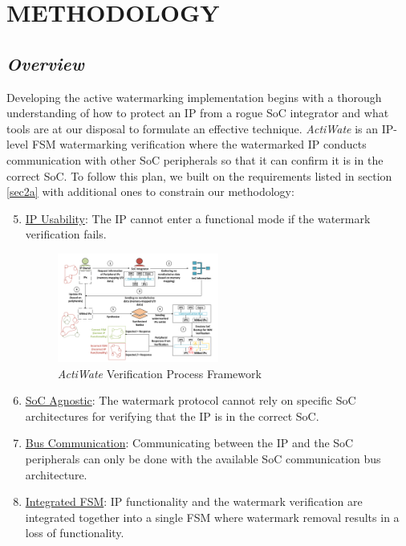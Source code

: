 \documentclass[onecolumn]{IEEEtran}
\begin{document}
\section{METHODOLOGY}
\label{sec3}
\subsection{\textit{Overview}}
\label{sec3a}
Developing the active watermarking implementation begins with a
thorough understanding of how to protect an IP from a rogue SoC
integrator and what tools are at our disposal to formulate an effective
technique. \textit{ActiWate} is an IP-level FSM watermarking verification
where the watermarked IP conducts communication with other SoC
peripherals so that it can confirm it is in the correct SoC. To follow
this plan, we built on the requirements listed in section \ref{sec2a} with
additional ones to constrain our methodology:

\begin{enumerate}[label=(R\arabic*)]
	\setcounter{enumi}{4}
	\item \underline{IP Usability}: The IP cannot enter a functional mode if the
	watermark verification fails.
	\begin{figure}[H]
		\centering
		\includegraphics[width=0.5\textwidth]{fig2.png}
		\caption{\textit{ActiWate} Verification Process Framework}
		\captionsetup{justification=centering}
		\label{fig2}
	\end{figure}
	
	\item \underline{SoC Agnostic}: The watermark protocol cannot rely on specific
	SoC architectures for verifying that the IP is in the correct SoC.
	
	\item \underline{Bus Communication}: Communicating between the IP and the
	SoC peripherals can only be done with the available SoC
	communication bus architecture.
	
	\item \underline{Integrated FSM}: IP functionality and the watermark verification
	are integrated together into a single FSM where watermark
	removal results in a loss of functionality.\\
\end{enumerate}
\end{document}
